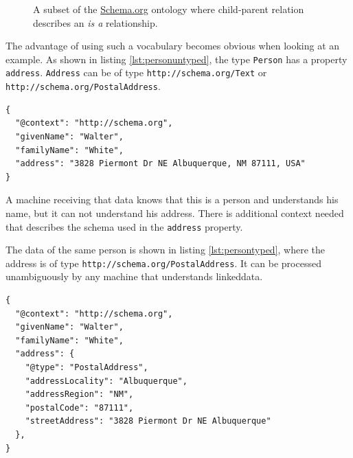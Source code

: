 \begin{figure}[!htb]
  \caption{ A subset of the \url{Schema.org} ontology where child-parent relation describes an \textit{is a} relationship.}
  \label{fig:schemaorg}
\end{figure}

The advantage of using such a vocabulary becomes obvious when looking at an example. As shown in listing \ref{lst:personuntyped}, the type \lstinline{Person} has a property \lstinline{address}. \lstinline{Address} can be of type \lstinline{http://schema.org/Text} or \lstinline{http://schema.org/PostalAddress}.

\lstset{language=JSON}
\begin{lstlisting}[caption=A person with an address of type Text., label=lst:personuntyped]
{
  "@context": "http://schema.org",
  "givenName": "Walter",
  "familyName": "White",
  "address": "3828 Piermont Dr NE Albuquerque, NM 87111, USA"
}
\end{lstlisting}

A machine receiving that data knows that this is a person and understands his name, but it can not understand his address. There is additional context needed that describes the schema used in the \lstinline{address} property.

The data of the same person is shown in listing \ref{lst:persontyped}, where the address is of type \lstinline{http://schema.org/PostalAddress}. It can be processed unambiguously by any machine that understands \gls{linkeddata}.

\lstset{language=JSON}
\begin{lstlisting}[caption=A person with an address of type PostalAddress., label=lst:persontyped]
{
  "@context": "http://schema.org",
  "givenName": "Walter",
  "familyName": "White",
  "address": {
    "@type": "PostalAddress",
    "addressLocality": "Albuquerque",
    "addressRegion": "NM",
    "postalCode": "87111",
    "streetAddress": "3828 Piermont Dr NE Albuquerque"
  },
}
\end{lstlisting}

